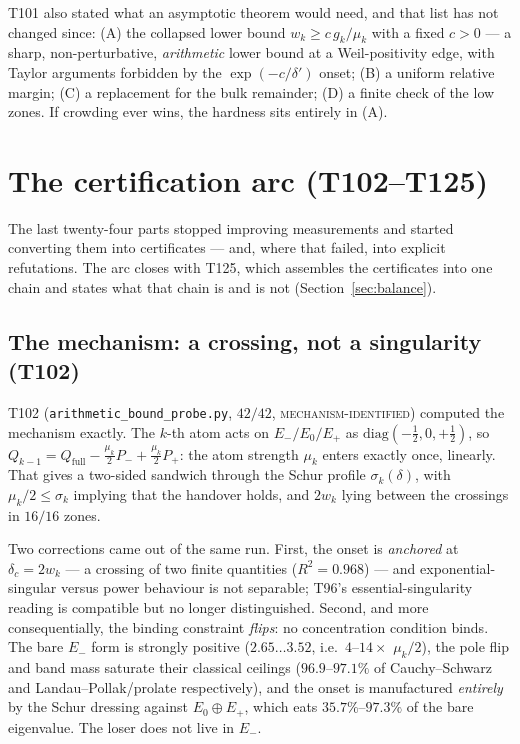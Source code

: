 \documentclass[11pt,a4paper]{article}
\newcommand{\Qfull}{Q_{\mathrm{full}}}
\begin{document}
\noindent T101 also stated what an asymptotic theorem would need, and that list has not changed since:
(A) the collapsed lower bound $w_k\ge c\,g_k/\mu_k$ with a fixed $c>0$ --- a sharp, non-perturbative,
\emph{arithmetic} lower bound at a Weil-positivity edge, with Taylor arguments forbidden by the
$\exp(-c/\delta')$ onset; (B) a uniform relative margin; (C) a replacement for the bulk remainder;
(D) a finite check of the low zones. If crowding ever wins, the hardness sits entirely in (A).

\section{The certification arc (T102--T125)}\label{sec:certification}
The last twenty-four parts stopped improving measurements and started converting them into certificates ---
and, where that failed, into explicit refutations. The arc closes with T125, which assembles the
certificates into one chain and states what that chain is and is not
(Section~\ref{sec:balance}).

\subsection{The mechanism: a crossing, not a singularity (T102)}
T102 (\texttt{arithmetic\_bound\_probe.py}, $42/42$, \textsc{mechanism-identified}) computed the
mechanism exactly. The $k$-th atom acts on $E_-/E_0/E_+$ as $\mathrm{diag}(-\tfrac12,0,+\tfrac12)$, so
$Q_{k-1}=\Qfull-\tfrac{\mu_k}{2}P_-+\tfrac{\mu_k}{2}P_+$: the atom strength $\mu_k$ enters exactly once,
linearly. That gives a two-sided sandwich through the Schur profile $\sigma_k(\delta)$, with
$\mu_k/2\le\sigma_k$ implying that the handover holds, and $2w_k$ lying between the crossings in
$16/16$ zones.

Two corrections came out of the same run. First, the onset is \emph{anchored} at $\delta_c=2w_k$ --- a
crossing of two finite quantities ($R^2=0.968$) --- and exponential-singular versus power behaviour is
not separable; T96's essential-singularity reading is compatible but no longer distinguished. Second,
and more consequentially, the binding constraint \emph{flips}: no concentration condition binds. The
bare $E_-$ form is strongly positive ($2.65\ldots3.52$, i.e.\ $4$--$14\times$ $\mu_k/2$), the pole flip
and band mass saturate their classical ceilings ($96.9$--$97.1\%$ of Cauchy--Schwarz and
Landau--Pollak/prolate respectively), and the onset is manufactured \emph{entirely} by the Schur
dressing against $E_0\oplus E_+$, which eats $35.7\%$--$97.3\%$ of the bare eigenvalue. The loser does
not live in $E_-$.
\end{document}
